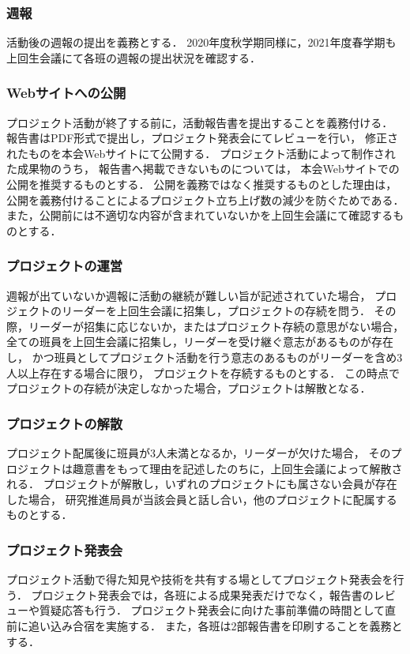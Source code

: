 \subsubsection*{週報}
活動後の週報の提出を義務とする．
2020年度秋学期同様に，2021年度春学期も上回生会議にて各班の週報の提出状況を確認する．

\subsubsection*{Webサイトへの公開}
プロジェクト活動が終了する前に，活動報告書を提出することを義務付ける．
報告書はPDF形式で提出し，プロジェクト発表会にてレビューを行い，
修正されたものを本会Webサイトにて公開する．
プロジェクト活動によって制作された成果物のうち，
報告書へ掲載できないものについては，
本会Webサイトでの公開を推奨するものとする．
公開を義務ではなく推奨するものとした理由は，
公開を義務付けることによるプロジェクト立ち上げ数の減少を防ぐためである．
また，公開前には不適切な内容が含まれていないかを上回生会議にて確認するものとする．

\subsubsection*{プロジェクトの運営}
週報が出ていないか週報に活動の継続が難しい旨が記述されていた場合，
プロジェクトのリーダーを上回生会議に招集し，プロジェクトの存続を問う．
その際，リーダーが招集に応じないか，またはプロジェクト存続の意思がない場合，
全ての班員を上回生会議に招集し，リーダーを受け継ぐ意志があるものが存在し，
かつ班員としてプロジェクト活動を行う意志のあるものがリーダーを含め3人以上存在する場合に限り，
プロジェクトを存続するものとする．
この時点でプロジェクトの存続が決定しなかった場合，プロジェクトは解散となる．

\subsubsection*{プロジェクトの解散}
プロジェクト配属後に班員が3人未満となるか，リーダーが欠けた場合，
そのプロジェクトは趣意書をもって理由を記述したのちに，上回生会議によって解散される．
プロジェクトが解散し，いずれのプロジェクトにも属さない会員が存在した場合，
研究推進局員が当該会員と話し合い，他のプロジェクトに配属するものとする．

\subsubsection*{プロジェクト発表会}
プロジェクト活動で得た知見や技術を共有する場としてプロジェクト発表会を行う．
プロジェクト発表会では，各班による成果発表だけでなく，報告書のレビューや質疑応答も行う．
プロジェクト発表会に向けた事前準備の時間として直前に追い込み合宿を実施する．
また，各班は2部報告書を印刷することを義務とする．